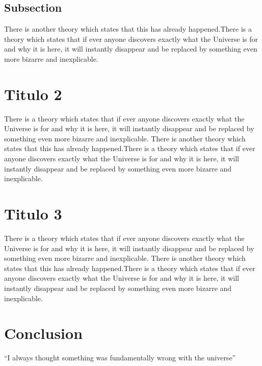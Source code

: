\documentclass{article}
\begin{document}
\begin{multicols}{3}
\subsection{Subsection}
There is another theory which states that this has already happened.There is a theory which states that if ever anyone discovers exactly what the Universe is for and why it is here, it will instantly disappear and be replaced by something even more bizarre and inexplicable.

\section{Titulo 2}
There is a theory which states that if ever anyone discovers exactly what the Universe is for and why it is here, it will instantly disappear and be replaced by something even more bizarre and inexplicable.
There is another theory which states that this has already happened.There is a theory which states that if ever anyone discovers exactly what the Universe is for and why it is here, it will instantly disappear and be replaced by something even more bizarre and inexplicable.
\section{Titulo 3}
There is a theory which states that if ever anyone discovers exactly what the Universe is for and why it is here, it will instantly disappear and be replaced by something even more bizarre and inexplicable.
There is another theory which states that this has already happened.There is a theory which states that if ever anyone discovers exactly what the Universe is for and why it is here, it will instantly disappear and be replaced by something even more bizarre and inexplicable.



\section{Conclusion}
``I always thought something was fundamentally wrong with the universe'' \citep{adams1995hitchhiker}




\end{multicols}
\end{document}
